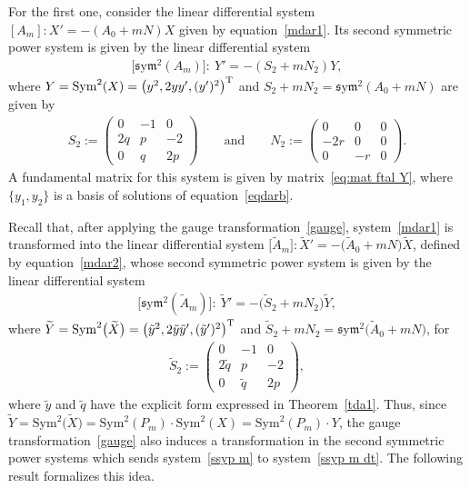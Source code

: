 \documentclass[10pt,a4paper]{amsart}
\numberwithin{equation}{section}
\def\Sym{\mathrm{Sym}}
\def\sym{\mathfrak{s}\mathrm{y}\mathfrak{m}}
\begin{document}
For the first one, consider the linear differential system $[A_m]\colon X'=-(A_0+mN) X$ given by equation~\eqref{mdar1}. Its second symmetric power system is given by the linear differential system
\begin{gather}\label{ssyp m}
\big[\sym^2 (A_m)\big]\colon\ Y'=-(S_2 +m N_2) Y ,
\end{gather}
where $Y=\Sym^2 (X) = \big(y^2 ,2yy', (y')^2\big)^{\rm T}$ and $S_2 +m N_2 = \sym^2 (A_0 +mN)$ are given by
\begin{gather*}
S_2:=\begin{pmatrix} 0&-1&0\\2q &p &-2\\0&q&2p\end{pmatrix} \qquad \text{and} \qquad N_2:=\begin{pmatrix}0&0&0\\ -2r& 0& 0\\0&- r&0\end{pmatrix}\!.
\end{gather*}
A fundamental matrix for this system is given by matrix~\eqref{eq:mat ftal Y}, where $\{ y_1, y_2 \}$ is a basis of solutions of equation~\eqref{eqdarb}.

Recall that, after applying the gauge transformation~\eqref{gauge}, system~\eqref{mdar1} is transformed into the linear differential system $\big[\widetilde{A}_m\big]\colon \widetilde{X}'=-\big(\widetilde A_0+mN\big) \widetilde{X}$, defined by equation~\eqref{mdar2}, whose second symmetric power system is given by the linear differential system
\begin{gather}\label{ssyp m dt}
\big[\sym^2 (\widetilde{A}_m)\big]\colon\ \widetilde{Y}'=-\big(\widetilde{S}_2+ m N_2\big) \widetilde{Y} ,
\end{gather}
where $\widetilde{Y}= \Sym^2 \big(\widetilde{X}\big) = \big(\tilde{y}^2 ,2\tilde{y} \tilde{y}', (\tilde{y}')^2\big)^{\rm T}$ and
$\widetilde{S}_2+ m N_2 = \sym^2 \big(\widetilde{A}_0 +mN\big)$, for
\begin{gather*}
\widetilde{S}_2:=\begin{pmatrix} 0&-1&0 \\ 2\tilde{q} &p &-2 \\ 0& \tilde{q} &2p\end{pmatrix}\!,
\end{gather*}
where $\tilde{y}$ and $\tilde{q}$ have the explicit form expressed in Theorem~\ref{tda1}. Thus, since $\widetilde{Y}= \Sym^2 \big(\widetilde{X}\big) = \Sym^2 (P_m) \cdot \Sym^2 (X) = \Sym^2 (P_m) \cdot Y $, the gauge transformation~\eqref{gauge} also induces a transformation in the second symmetric power systems which sends system~\eqref{ssyp m} to system~\eqref{ssyp m dt}.
The following result formalizes this idea.
\end{document}
